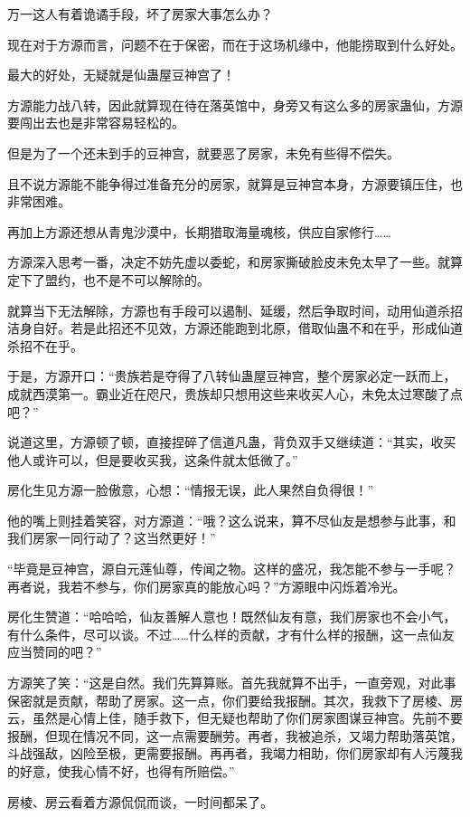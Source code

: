 \begin{this_body}
万一这人有着诡谲手段，坏了房家大事怎么办？

现在对于方源而言，问题不在于保密，而在于这场机缘中，他能捞取到什么好处。

最大的好处，无疑就是仙蛊屋豆神宫了！

方源能力战八转，因此就算现在待在落英馆中，身旁又有这么多的房家蛊仙，方源要闯出去也是非常容易轻松的。

但是为了一个还未到手的豆神宫，就要恶了房家，未免有些得不偿失。

且不说方源能不能争得过准备充分的房家，就算是豆神宫本身，方源要镇压住，也非常困难。

再加上方源还想从青鬼沙漠中，长期猎取海量魂核，供应自家修行……

方源深入思考一番，决定不妨先虚以委蛇，和房家撕破脸皮未免太早了一些。就算定下了盟约，也不是不可以解除的。

就算当下无法解除，方源也有手段可以遏制、延缓，然后争取时间，动用仙道杀招洁身自好。若是此招还不见效，方源还能跑到北原，借取仙蛊不和在乎，形成仙道杀招不在乎。

于是，方源开口：“贵族若是夺得了八转仙蛊屋豆神宫，整个房家必定一跃而上，成就西漠第一。霸业近在咫尺，贵族却只想用这些来收买人心，未免太过寒酸了点吧？”

说道这里，方源顿了顿，直接捏碎了信道凡蛊，背负双手又继续道：“其实，收买他人或许可以，但是要收买我，这条件就太低微了。”

房化生见方源一脸傲意，心想：“情报无误，此人果然自负得很！”

他的嘴上则挂着笑容，对方源道：“哦？这么说来，算不尽仙友是想参与此事，和我们房家一同行动了？这当然更好！”

“毕竟是豆神宫，源自元莲仙尊，传闻之物。这样的盛况，我怎能不参与一手呢？再者说，我若不参与，你们房家真的能放心吗？”方源眼中闪烁着冷光。

房化生赞道：“哈哈哈，仙友善解人意也！既然仙友有意，我们房家也不会小气，有什么条件，尽可以谈。不过……什么样的贡献，才有什么样的报酬，这一点仙友应当赞同的吧？”

方源笑了笑：“这是自然。我们先算算账。首先我就算不出手，一直旁观，对此事保密就是贡献，帮助了房家。这一点，你们要给我报酬。其次，我救下了房棱、房云，虽然是心情上佳，随手救下，但无疑也帮助了你们房家图谋豆神宫。先前不要报酬，但现在情况不同，这一点需要酬劳。再者，我被追杀，又竭力帮助落英馆，斗战强敌，凶险至极，更需要报酬。再再者，我竭力相助，你们房家却有人污蔑我的好意，使我心情不好，也得有所赔偿。”

房棱、房云看着方源侃侃而谈，一时间都呆了。


\end{this_body}
